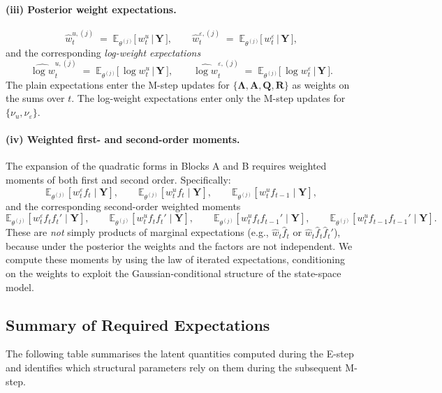 \documentclass[11pt, a4paper, oneside]{article}
\newcommand{\mY}{\mathbf{Y}}
\newcommand{\mL}{\boldsymbol{\Lambda}}
\newcommand{\mA}{\mathbf{A}}
\newcommand{\mR}{\mathbf{R}}
\newcommand{\mQ}{\mathbf{Q}}
\begin{document}
\paragraph{(iii) Posterior weight expectations.}
\[
\hat{w}^{u,(j)}_t \;=\; \mathbb{E}_{\theta^{(j)}}\!\big[\, w^u_t \,\big|\, \mY\,\big],
\qquad
\hat{w}^{\varepsilon,(j)}_t \;=\; \mathbb{E}_{\theta^{(j)}}\!\big[\, w^\varepsilon_t \,\big|\, \mY\,\big],
\]
and the corresponding \emph{log-weight expectations}
\[
\widehat{\log w}^{u,(j)}_t \;=\; \mathbb{E}_{\theta^{(j)}}\!\big[\, \log w^u_t \,\big|\, \mY\,\big],
\qquad
\widehat{\log w}^{\varepsilon,(j)}_t \;=\; \mathbb{E}_{\theta^{(j)}}\!\big[\, \log w^\varepsilon_t \,\big|\, \mY\,\big].
\]
The plain expectations enter the M-step updates for
$\{\mL, \mA, \mQ, \mR\}$ as weights
on the sums over $t$. The log-weight expectations enter only the
M-step updates for $\{\nu_u, \nu_\varepsilon\}$.


\paragraph{(iv) Weighted first- and second-order moments.}
The expansion of the quadratic forms in Blocks A and B requires
weighted moments of both first and second order. Specifically:
\[
\mathbb{E}_{\theta^{(j)}}[w^\varepsilon_t f_t \mid \mY],
\qquad
\mathbb{E}_{\theta^{(j)}}[w^u_t f_t \mid \mY],
\qquad
\mathbb{E}_{\theta^{(j)}}[w^u_t f_{t-1} \mid \mY],
\]
and the corresponding second-order weighted moments
\[
\mathbb{E}_{\theta^{(j)}}[w^\varepsilon_t f_t f_t' \mid \mY],
\qquad
\mathbb{E}_{\theta^{(j)}}[w^u_t f_t f_t' \mid \mY],
\qquad
\mathbb{E}_{\theta^{(j)}}[w^u_t f_t f_{t-1}' \mid \mY],
\qquad
\mathbb{E}_{\theta^{(j)}}[w^u_t f_{t-1} f_{t-1}' \mid \mY].
\]
These are \emph{not} simply products of marginal expectations
(e.g., $\hat{w}_t \hat{f}_t$ or $\hat{w}_t \hat{f}_t \hat{f}_t'$),
because under the posterior the weights and the factors are not
independent. We compute these moments by using the law of iterated
expectations, conditioning on the weights to exploit the
Gaussian-conditional structure of the state-space model.


\subsection{Summary of Required Expectations}

The following table summarises the latent quantities computed during the E-step and identifies which structural parameters rely on them during the subsequent M-step.
\end{document}
